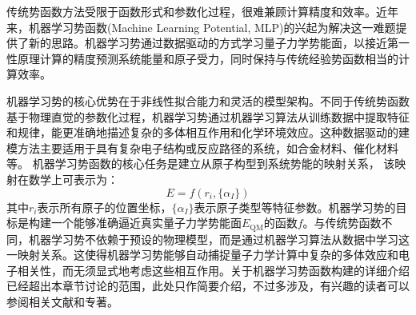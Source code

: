 传统势函数方法受限于函数形式和参数化过程，很难兼顾计算精度和效率。近年来，机器学习势函数\textrm{(Machine Learning Potential, MLP)}的兴起为解决这一难题提供了新的思路。机器学习势通过数据驱动的方式学习量子力学势能面，以接近第一性原理计算的精度预测系统能量和原子受力，同时保持与传统经验势函数相当的计算效率。

机器学习势的核心优势在于非线性拟合能力和灵活的模型架构。不同于传统势函数基于物理直觉的参数化过程，机器学习势通过机器学习算法从训练数据中提取特征和规律，能更准确地描述复杂的多体相互作用和化学环境效应。这种数据驱动的建模方法主要适用于具有复杂电子结构或反应路径的系统，如合金材料、催化材料等。
机器学习势函数的核心任务是建立从原子构型到系统势能的映射关系，%
该映射在数学上可表示为：
\begin{equation}
	E = f({r_i}, \{\alpha_I\})
	\label{eq:MLP-1}
\end{equation}
其中$r_i$表示所有原子的位置坐标，$\{\alpha_I\}$表示原子类型等特征参数。机器学习势的目标是构建一个能够准确逼近真实量子力学势能面$E_{\mathrm{QM}}$的函数$f$。与传统势函数不同，机器学习势不依赖于预设的物理模型，而是通过机器学习算法从数据中学习这一映射关系。这使得机器学习势能够自动捕捉量子力学计算中复杂的多体效应和电子相关性，而无须显式地考虑这些相互作用。关于机器学习势函数构建的详细介绍已经超出本章节讨论的范围，此处只作简要介绍，不过多涉及，有兴趣的读者可以参阅相关文献和专著\cite{ACI56-12828_2017,NEURIPSe2ad76f2_2018,SciAdv3-e1701816_2017,SciAdv3-e1603015_2017,Natcomm12-7273_2021}。

